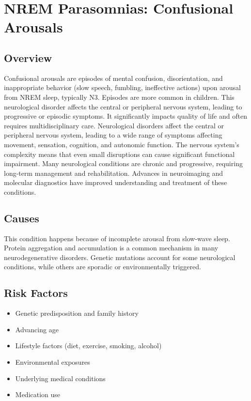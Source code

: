 \chapter{NREM Parasomnias: Confusional Arousals}
\label{sec:Confusional Arousals}

\section{Overview}
Confusional arousals are episodes of mental confusion, disorientation, and inappropriate behavior (slow speech, fumbling, ineffective actions) upon arousal from NREM sleep, typically N3. Episodes are more common in children. This neurological disorder affects the central or peripheral nervous system, leading to progressive or episodic symptoms. It significantly impacts quality of life and often requires multidisciplinary care. Neurological disorders affect the central or peripheral nervous system, leading to a wide range of symptoms affecting movement, sensation, cognition, and autonomic function. The nervous system's complexity means that even small disruptions can cause significant functional impairment. Many neurological conditions are chronic and progressive, requiring long-term management and rehabilitation. Advances in neuroimaging and molecular diagnostics have improved understanding and treatment of these conditions.
\section{Causes}
This condition happens because of incomplete arousal from slow-wave sleep.    Protein aggregation and accumulation is a common mechanism in many neurodegenerative disorders.  Genetic mutations account for some neurological conditions, while others are sporadic or environmentally triggered.   
\section{Risk Factors}
\begin{itemize}[noitemsep]
  \item Genetic predisposition and family history
  \item Advancing age
  \item Lifestyle factors (diet, exercise, smoking, alcohol)
  \item Environmental exposures
  \item Underlying medical conditions
  \item Medication use
\end{itemize}
